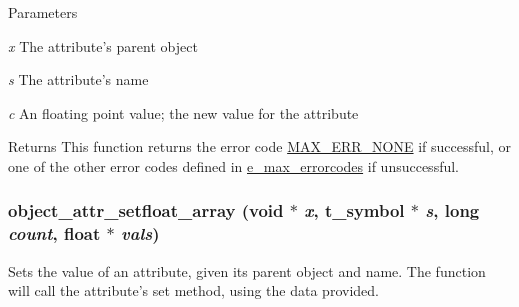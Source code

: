 \begin{DoxyParams}{Parameters}
\item[{\em x}]The attribute's parent object \item[{\em s}]The attribute's name \item[{\em c}]An floating point value; the new value for the attribute\end{DoxyParams}
\begin{DoxyReturn}{Returns}
This function returns the error code \hyperlink{group__misc_gga0764dd6c02b76cca7d053ae50555d69da6d22f77fef8b1e1b074cef5d29d935fd}{MAX\_\-ERR\_\-NONE} if successful, or one of the other error codes defined in \hyperlink{group__misc_ga0764dd6c02b76cca7d053ae50555d69d}{e\_\-max\_\-errorcodes} if unsuccessful. 
\end{DoxyReturn}
\hypertarget{group__attr_gafc8592ad342f15b050344b1e00705e2b}{
\subsubsection[{object\_\-attr\_\-setfloat\_\-array}]{ object\_\-attr\_\-setfloat\_\-array (void $\ast$ {\em x}, \/  {\bf t\_\-symbol} $\ast$ {\em s}, \/  long {\em count}, \/  float $\ast$ {\em vals})}}
\label{group__attr_gafc8592ad342f15b050344b1e00705e2b}


Sets the value of an attribute, given its parent object and name. The function will call the attribute's {\ttfamily set} method, using the data provided.


